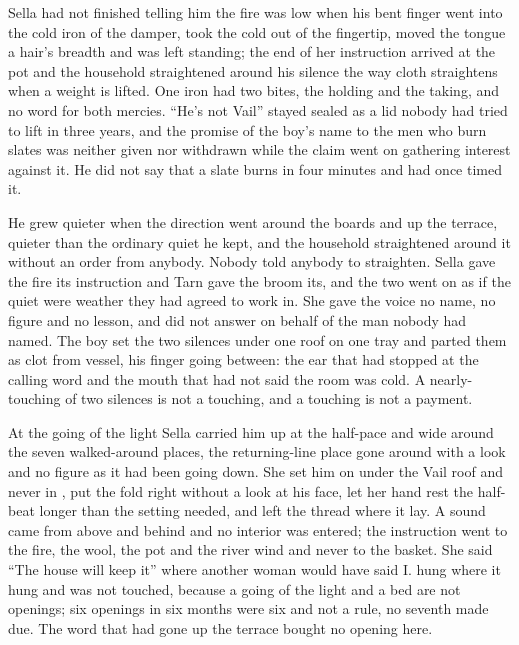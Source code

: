 Sella had not finished telling him the fire was low when his bent finger went into the cold iron of the damper, took the cold out of the fingertip, moved the tongue a hair's breadth and was left standing; the end of her instruction arrived at the pot and the household straightened around his silence the way cloth straightens when a weight is lifted. One iron had two bites, the holding and the taking, and no  word for both mercies. “He's not Vail” stayed sealed as a lid nobody had tried to lift in three years, and the promise of the boy's name to the men who burn slates was neither given nor withdrawn while the claim went on gathering interest against it. He did not say that a slate burns in four minutes and had once timed it.

He grew quieter when the direction went around the boards and up the terrace, quieter than the ordinary quiet he kept, and the household straightened around it without an order from anybody. Nobody told anybody to straighten. Sella gave the fire its instruction and Tarn gave the broom its, and the two went on as if the quiet were weather they had agreed to work in. She gave the voice no name, no figure and no lesson, and did not answer on behalf of the man nobody had named. The boy set the two silences under one roof on one tray and parted them as clot from vessel, his finger going between: the ear that had stopped at the calling word and the mouth that had not said the room was cold. A nearly-touching of two silences is not a touching, and a touching is not a payment.

\scenebreak

At the going of the light Sella carried him up at the half-pace and wide around the seven walked-around places, the returning-line place gone around with a look and no figure as it had been going down. She set him on  under the Vail roof and never in , put the fold right without a look at his face, let her hand rest the half-beat longer than the setting needed, and left the thread where it lay. A sound came from above and behind and no interior was entered; the instruction went to the fire, the wool, the pot and the river wind and never to the basket. She said “The house will keep it” where another woman would have said I.  hung where it hung and was not touched, because a going of the light and a bed are not openings; six openings in six months were six and not a rule, no seventh made due. The word that had gone up the terrace bought no opening here.

